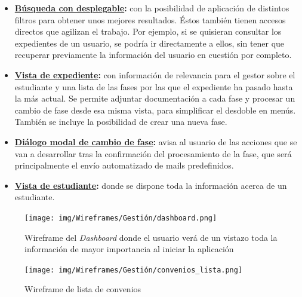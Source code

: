 \begin{itemize}
	\item \textbf{\hyperref[fig:busquedaWF]{Búsqueda con desplegable}:} con la posibilidad de aplicación de distintos filtros para obtener unos mejores resultados. Éstos también tienen accesos directos que agilizan el trabajo. Por ejemplo, si se quisieran consultar los expedientes de un usuario, se podría ir directamente a ellos, sin tener que recuperar previamente la información del usuario en cuestión por completo.
	\item \textbf{\hyperref[fig:expediente_detalleWF]{Vista de expediente}:} con información de relevancia para el gestor sobre el estudiante y una lista de las fases por las que el expediente ha pasado hasta la más actual. Se permite adjuntar documentación a cada fase y procesar un cambio de fase desde esa misma vista, para simplificar el desdoble en menús. También se incluye la posibilidad de crear una nueva fase.
	\item \textbf{\hyperref[fig:cambio_faseWF]{Diálogo modal de cambio de fase}:} avisa al usuario de las acciones que se van a desarrollar tras la confirmación del procesamiento de la fase, que será principalmente el envío automatizado de mails predefinidos.
	\item \textbf{\hyperref[fig:estudiante_detalleWF]{Vista de estudiante}:} donde se dispone toda la información acerca de un estudiante.
\end{itemize}

\begin{figure}
	\centering
	\texttt{[image: img/Wireframes/Gestión/dashboard.png]}
	\caption[Wireframe de \textit{Dashboard}]{Wireframe del \textit{Dashboard} donde el usuario verá de un vistazo toda la información de mayor importancia al iniciar la aplicación}
	\label{fig:dashboardWF}
\end{figure}

\begin{figure}
	\centering
	\texttt{[image: img/Wireframes/Gestión/convenios\_lista.png]}
	\caption{Wireframe de lista de convenios}
	\label{fig:convenios_listaWF}
\end{figure}

